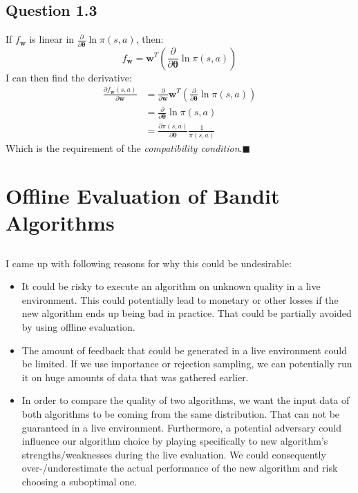 \documentclass[a4paper]{article}
\newcommand*{\QEDA}{\hfill\ensuremath{\blacksquare}}%
\newcommand*{\bs}[1]{\boldsymbol{#1}}
\begin{document}
\subsection*{Question 1.3}
\label{subsec:13}
If $f_{\boldsymbol{w}}$ is linear in $\frac{\partial}{\partial
  \boldsymbol{\theta}} \ln \pi(s, a)$, then: 
\[
f_{\boldsymbol{w}} = \bs{w}^T \left(\frac{\partial}{\partial \boldsymbol{\theta}} \ln \pi(s, a)\right)
\]
I can then find the derivative:
\begin{align*}
  \frac{\partial f_{\bs{w}} (s,a)}{\partial \boldsymbol{w}} &=
  \frac{\partial}{\partial \boldsymbol{w}} \bs{w}^T
  \left(\frac{\partial}{\partial \boldsymbol{\theta}} \ln \pi(s, a)\right)\\
  &=
  \frac{\partial}{\partial \boldsymbol{\theta}} \ln \pi(s, a)\\
  &= \frac{\partial \pi(s,a)}{\partial
    \bs{\theta}}\frac{1}{\pi(s, a)} \tag{using chain rule}
\end{align*}
Which is the requirement of the \emph{compatibility condition}.\QEDA

\section{Offline Evaluation of Bandit Algorithms}
\label{sec:2}
\subsection{}
\label{subsec:21}
I came up with following reasons for why this could be undesirable:
\begin{itemize}
\item It could be risky to execute an algorithm on unknown quality in a live environment.
  This could potentially lead to monetary or other losses if the new
  algorithm ends up being bad in practice. That could be partially avoided by
  using offline evaluation.
\item The amount of feedback that could be generated in a live environment could
  be limited. If we use importance or rejection sampling, we can potentially run it on
  huge amounts of data that was gathered earlier.
\item In order to compare the quality of two algorithms, we want the input data
  of both algorithms to be coming from the same distribution. That can not be
  guaranteed in a live environment. Furthermore, a potential adversary could
  influence our algorithm choice by playing specifically to new algorithm's
  strengths/weaknesses during the live evaluation.
  We could consequently over-/underestimate the actual performance of the new
  algorithm and risk choosing a suboptimal one.
\end{itemize}
\end{document}
